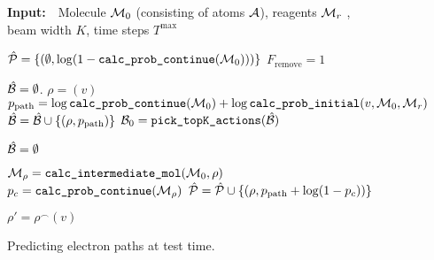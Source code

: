 

\newcommand{\cProbCont}{\texttt{calc\_prob\_continue}}
\newcommand{\cProbAct}{\texttt{calc\_prob\_action}}
\newcommand{\cProbInitial}{\texttt{calc\_prob\_initial}}
\newcommand{\removeFlag}{F_\textrm{remove}}

\newcommand{\outputPool}{\hat{\Pc}}
\newcommand{\cPath}{\rho}
\newcommand{\lProb}{p_{\textrm{path}}}


\begin{figure}
\begin{minipage}{1.\textwidth}
\begin{algorithm}[H]
  \caption{Predicting electron paths at test time.}
  {\bf Input:}~~Molecule ${\mathcal{M}}_0$ (consisting of atoms ${\mathcal{A}}$), reagents ${\mathcal{M}}_r$ , beam width $K$, time steps $T^\mathrm{max}$
  
  \begin{algorithmic}[1]
  	\STATE $\outputPool = \{\left( \emptyset, \log (1 - \cProbCont(\Mc_0)) \right) \}$  
  	\STATE $\removeFlag \!=\!1$ 
  	
  	\STATE
	\STATE $\hat{{\mathcal{B}}} = \emptyset$.  	
		\STATE $ \cPath = (v)$
		\STATE $ \lProb = \log \cProbCont(\Mc_0) + \log \cProbInitial(v, \moleculeSet_0, \moleculeSet_r)$
		\STATE $\hat{\Bc} = \hat{\Bc} \cup \{\left(\cPath, \lProb \right)\}$
	\ENDFOR
	\STATE  ${\mathcal{B}}_{0} = \texttt{pick\_topK\_actions}(\hat{{\mathcal{B}}})$ 
	
	\STATE
		\STATE $\hat{{\mathcal{B}}} = \emptyset $ 
				
		\FORALL{$(\cPath, \lProb) \in \Bc_{t-1}$} 
			
			\STATE $\Mc_\cPath = \texttt{calc\_intermediate\_mol}(\Mc_0, \cPath)$
			\STATE $p_c = \cProbCont(\Mc_\cPath)$
			\STATE $\hat{\Pc} = \hat{\Pc} \cup \{(\cPath, \lProb + \log (1 - p_c))\}$
			
				\STATE $\cPath' = \cPath^\frown (v)$ 


\end{algorithmic}
\end{algorithm}
\end{minipage}
\end{figure}
